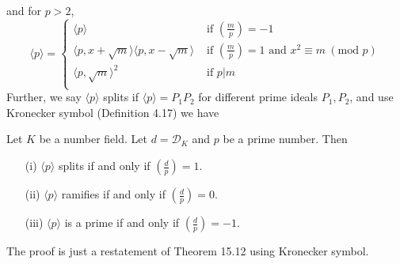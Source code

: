 and for $p>2$,
\begin{equation*}
\langle p \rangle= \left\{
\begin{array}{ll}
\langle p \rangle & \text{ if } \left(\frac{m}{p}\right)=-1\\
\langle p,x+\sqrt{m} \rangle \langle p,x-\sqrt{m} \rangle & \text{ if } \left(\frac{m}{p}\right)=1 \text{ and }
x^2 \equiv m~(\text{mod } p)\\
\langle p,\sqrt{m} \rangle^2 & \text{ if } p|m\\
\end{array} \right.
\end{equation*}
Further, we say $\langle p \rangle$ splits if $\langle p \rangle=P_1P_2$ for different prime ideals $P_1,P_2$, and use
Kronecker symbol (Definition 4.17) we have
\begin{corollary} Let $K$ be a number field. Let $d=\mathcal{D}_K$ and $p$ be a prime number. Then
\begin{enumerate}
\item[(i)] $\langle p \rangle$ splits if and only if $(\frac{d}{p})=1$.
\item[(ii)] $\langle p \rangle$ ramifies if and only if $(\frac{d}{p})=0$.
\item[(iii)] $\langle p \rangle$ is a prime if and only if $(\frac{d}{p})=-1$.
\end{enumerate}
\end{corollary}
The proof is just a restatement of Theorem 15.12 using Kronecker symbol.

